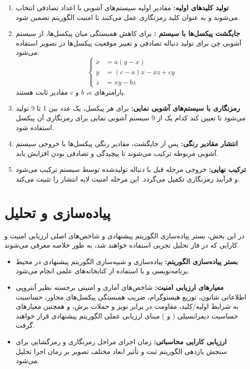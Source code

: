 \begin{enumerate}
    \item \textbf{تولید کلیدهای اولیه:} مقادیر اولیه سیستم‌های آشوبی با اعداد تصادفی انتخاب می‌شوند و به عنوان کلید رمزنگاری عمل می‌کنند تا امنیت الگوریتم تضمین شود.
    \item \textbf{جایگشت پیکسل‌ها با سیستم :} برای کاهش همبستگی میان پیکسل‌ها، از سیستم آشوبی چن برای تولید دنباله تصادفی و تغییر موقعیت پیکسل‌ها در تصویر استفاده می‌شود:
    \begin{equation}
    \left\{ \begin{aligned}
        \dot{x} &= a(y - x) \\
        \dot{y} &= (c - a)x - xz + cy \\
        \dot{z} &= xy - bz
    \end{aligned} \right.
    \end{equation}
    پارامترهای $a$، $b$ و $c$ مقادیر ثابت هستند.
    \item \textbf{رمزنگاری با سیستم‌های آشوبی نمایی:} برای هر پیکسل، یک عدد بین 1 تا 9 تولید می‌شود تا تعیین کند کدام یک از 9 سیستم آشوبی نمایی برای رمزنگاری آن پیکسل استفاده شود.
    \item \textbf{انتشار مقادیر رنگی:} پس از جایگشت، مقادیر رنگی پیکسل‌ها با خروجی سیستم آشوبی مربوطه ترکیب می‌شوند تا پیچیدگی و تصادفی بودن افزایش یابد.
    \item \textbf{ترکیب نهایی:} خروجی مرحله قبل با دنباله تولیدشده توسط سیستم  ترکیب می‌شود و فرآیند رمزنگاری تکمیل می‌گردد. این مرحله امنیت لایه انتشار را تثبیت می‌کند.
\end{enumerate}

\section{پیاده‌سازی و تحلیل}
در این بخش، بستر پیاده‌سازی الگوریتم پیشنهادی و شاخص‌های اصلی ارزیابی امنیت و کارایی که در فاز تحلیل تجربی استفاده خواهند شد، به طور خلاصه معرفی می‌شوند.

\begin{itemize}
    \item \textbf{بستر پیاده‌سازی الگوریتم:} پیاده‌سازی و شبیه‌سازی الگوریتم پیشنهادی در محیط برنامه‌نویسی و با استفاده از کتابخانه‌های علمی انجام می‌شود.
    \item \textbf{معیارهای ارزیابی امنیت:} شاخص‌های آماری و امنیتی برجسته نظیر آنتروپی اطلاعاتی شانون، توزیع هیستوگرام، ضریب همبستگی پیکسل‌های مجاور، حساسیت به شرایط اولیه/کلید، مقاومت در برابر نویز و حملات برش، و همچنین معیارهای حساسیت دیفرانسیلی ( و ) مبنای ارزیابی عملی الگوریتم پیشنهادی قرار خواهند گرفت.
    \item \textbf{ارزیابی کارایی محاسباتی:} زمان اجرای مراحل رمزنگاری و رمزگشایی برای سنجش بازدهی الگوریتم ثبت و تأثیر ابعاد مختلف تصویر بر زمان اجرا تحلیل می‌شود.
\end{itemize}

